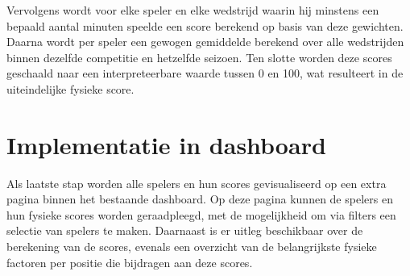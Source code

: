 Vervolgens wordt voor elke speler en elke wedstrijd waarin hij minstens een bepaald aantal minuten speelde een score berekend op basis van deze gewichten. Daarna wordt per speler een gewogen gemiddelde berekend over alle wedstrijden binnen dezelfde competitie en hetzelfde seizoen. Ten slotte worden deze scores geschaald naar een interpreteerbare waarde tussen 0 en 100, wat resulteert in de uiteindelijke fysieke score.

\section{Implementatie in dashboard}

Als laatste stap worden alle spelers en hun scores gevisualiseerd op een extra pagina binnen het bestaande dashboard. Op deze pagina kunnen de spelers en hun fysieke scores worden geraadpleegd, met de mogelijkheid om via filters een selectie van spelers te maken. Daarnaast is er uitleg beschikbaar over de berekening van de scores, evenals een overzicht van de belangrijkste fysieke factoren per positie die bijdragen aan deze scores.